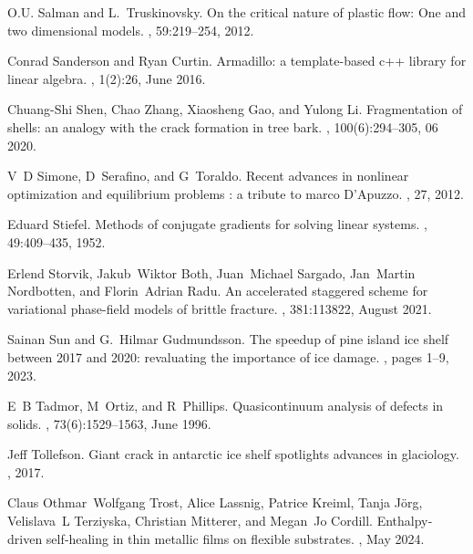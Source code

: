 \documentclass[10pt]{article}
\begin{document}
\begin{thebibliography}{10}
O.U. Salman and L.~Truskinovsky.
\newblock On the critical nature of plastic flow: One and two dimensional models.
, 59:219--254, 2012.

Conrad Sanderson and Ryan Curtin.
\newblock Armadillo: a template-based c++ library for linear algebra.
, 1(2):26, June 2016.

Chuang-Shi Shen, Chao Zhang, Xiaosheng Gao, and Yulong Li.
\newblock Fragmentation of shells: an analogy with the crack formation in tree bark.
, 100(6):294--305, 06 2020.

V~D Simone, D~Serafino, and G~Toraldo.
\newblock Recent advances in nonlinear optimization and equilibrium problems : a tribute to marco {D'Apuzzo}.
, 27, 2012.

Eduard Stiefel.
\newblock Methods of conjugate gradients for solving linear systems.
, 49:409--435, 1952.

Erlend Storvik, Jakub~Wiktor Both, Juan~Michael Sargado, Jan~Martin Nordbotten, and Florin~Adrian Radu.
\newblock An accelerated staggered scheme for variational phase-field models of brittle fracture.
, 381:113822, August 2021.

Sainan Sun and G.~Hilmar Gudmundsson.
\newblock The speedup of pine island ice shelf between 2017 and 2020: revaluating the importance of ice damage.
, pages 1--9, 2023.

E~B Tadmor, M~Ortiz, and R~Phillips.
\newblock Quasicontinuum analysis of defects in solids.
, 73(6):1529--1563, June 1996.

Jeff Tollefson.
\newblock Giant crack in antarctic ice shelf spotlights advances in glaciology.
, 2017.

Claus Othmar~Wolfgang Trost, Alice Lassnig, Patrice Kreiml, Tanja J{\"o}rg, Velislava~L Terziyska, Christian Mitterer, and Megan~Jo Cordill.
\newblock Enthalpy‐driven self‐healing in thin metallic films on flexible substrates.
, May 2024.


\end{thebibliography}
\end{document}
